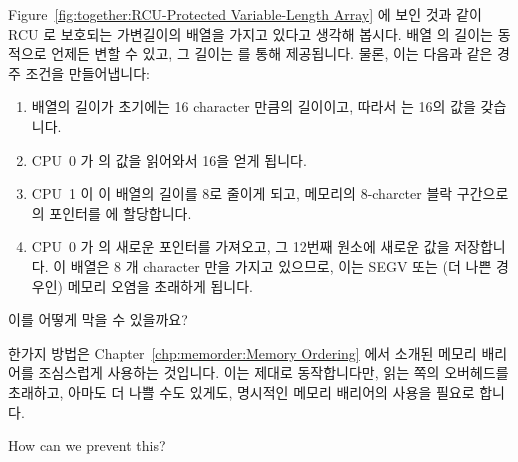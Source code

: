 Figure~\ref{fig:together:RCU-Protected Variable-Length Array} 에 보인 것과 같이
RCU 로 보호되는 가변길이의 배열을 가지고 있다고 생각해 봅시다.
배열  의 길이는 동적으로 언제든 변할 수 있고, 그 길이는 
를 통해 제공됩니다.
물론, 이는 다음과 같은 경주 조건을 만들어냅니다:
\iffalse

Suppose we have an RCU-protected variable-length array, as shown in
Figure~\ref{fig:together:RCU-Protected Variable-Length Array}.
The length of the array \co{->a[]} can change dynamically, and at any
given time, its length is given by the field \co{->length}.
Of course, this introduces the following race condition:
\fi

\begin{enumerate}
\item	배열의 길이가 초기에는 16 character 만큼의 길이이고, 따라서
	 는 16의 값을 갖습니다.
\item	CPU~0 가  의 값을 읽어와서 16을 얻게 됩니다.
\item	CPU~1 이 이 배열의 길이를 8로 줄이게 되고, 메모리의 8-charcter 블락
	구간으로의 포인터를  에 할당합니다.
\item	CPU~0 가  의 새로운 포인터를 가져오고, 그 12번째 원소에
	새로운 값을 저장합니다.
	이 배열은 8 개 character 만을 가지고 있으므로, 이는 SEGV 또는 (더 나쁜
	경우인) 메모리 오염을 초래하게 됩니다.
\iffalse

\item	The array is initially 16 characters long, and thus \co{->length}
	is equal to 16.
\item	CPU~0 loads the value of \co{->length}, obtaining the value 16.
\item	CPU~1 shrinks the array to be of length 8, and assigns a pointer
	to a new 8-character block of memory into \co{->a[]}.
\item	CPU~0 picks up the new pointer from \co{->a[]}, and stores a
	new value into element 12.
	Because the array has only 8 characters, this results in
	a SEGV or (worse yet) memory corruption.
\fi
\end{enumerate}

이를 어떻게 막을 수 있을까요?

한가지 방법은
Chapter~\ref{chp:memorder:Memory Ordering} 에서 소개된 메모리 배리어를
조심스럽게 사용하는 것입니다.
이는 제대로 동작합니다만, 읽는 쪽의 오버헤드를 초래하고, 아마도 더 나쁠 수도
있게도, 명시적인 메모리 배리어의 사용을 필요로 합니다.
\iffalse

How can we prevent this?

